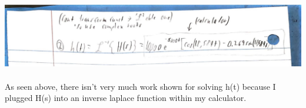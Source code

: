 \documentclass[12pt]{report}
\begin{document}
    \includegraphics[scale = 0.1]{B2D35933-62AD-46D5-A15F-ED4A113534AF.jpeg}

    \paragraph{} As seen above, there isn't very much work shown for solving h(t) because I plugged H(s) into an inverse laplace function within my calculator. 
\end{document}

